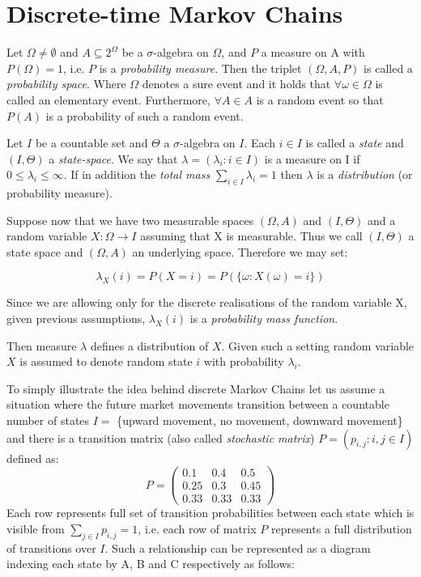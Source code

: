 \section{Discrete-time Markov Chains} %

Let $\Omega \neq \emptyset$ and $A \subseteq 2^{\Omega}$ be a $\sigma$-algebra on $\Omega$, and $P$ a measure on A with $P(\Omega) = 1$, i.e. $P$ is a {\it probability measure}. Then the triplet $(\Omega, A, P)$ is called a {\it probability space}. Where $\Omega$ denotes a sure event and it holds that $\forall \omega \in \Omega$ is called an elementary event. Furthermore, $\forall A \in A$ is a random event  so that $P(A)$ is a probability of such a random event. 

Let $I$ be a countable set and $\Theta$ a $\sigma$-algebra on $I$. Each $i \in I$ is called a {\it state} and $(I,\Theta)$ a {\it state-space}. We say that $\lambda = (\lambda_i : i \in I) $ is a measure on I if $0 \leq \lambda_i \leq \infty$. If in addition the {\it total mass} $\sum_{i \in I} \lambda_i = 1$ then $\lambda$ is a {\it distribution} (or probability measure). 

Suppose now that we have two measurable spaces $(\Omega,A)$ and $(I,\Theta)$ and a random variable $X: \Omega \rightarrow I$ assuming that X is measurable. Thus we call $(I,\Theta)$ a state space and $(\Omega, A)$ an underlying space. Therefore we may set:

\begin{equation}
\lambda_X(i) = P(X=i)=P(\{\omega: X(\omega)=i\})
\end{equation}

Since we are allowing only for the discrete realisations of the random variable X, given previous assumptions, $\lambda_X(i)$ is a {\it probability mass function}.

Then measure $\lambda$ defines a distribution of $X$. Given such a setting random variable $X$ is assumed to denote random state $i$ with probability $\lambda_i$. 

To simply illustrate the idea behind discrete Markov Chains let us assume a situation where the future market movements transition between a countable number of states $I =$ \{upward movement, no movement, downward movement\} and there is a transition matrix (also called {\it stochastic matrix}) $P = (p_{i,j} : i,j \in I)$ defined as:
\begin{equation*}
P =
\begin{pmatrix}
0.1 & 0.4 & 0.5 \\
0.25 & 0.3 & 0.45 \\
0.33 & 0.33 & 0.33 
\end{pmatrix}
\end{equation*}
Each row represents full set of transition probabilities between each state which is visible from $\sum_{j \in I} ^{}p_{i,j} = 1 $, i.e. each row of matrix $P$ represents a full distribution of transitions over $I$. Such a relationship can be represented as a diagram indexing each state by A, B and C respectively as follows:

